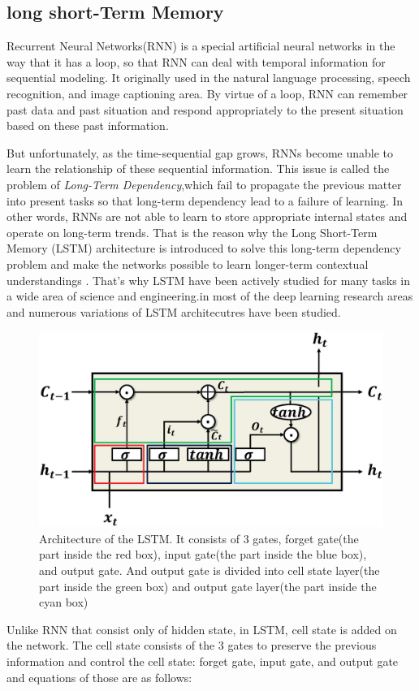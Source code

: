 \documentclass[letterpaper, 10 pt, conference]{ieeeconf}  %
\begin{document}
\subsection{long short-Term Memory}


Recurrent Neural Networks(RNN) is a special artificial neural networks in the way that it has a loop, so that RNN can deal with temporal information for sequential modeling. It originally used in the natural language processing, speech recognition, and image captioning area. By virtue of a loop, RNN can remember past data and past situation and respond appropriately to the present situation based on these past information. 

But unfortunately, as the time-sequential gap grows, RNNs become unable to learn the relationship of these sequential information. This issue is called the problem of \textit{Long-Term Dependency},which fail to propagate the previous matter into present tasks so that long-term dependency lead to a failure of learning. In other words, RNNs are not able to learn to store appropriate internal states and operate on long-term trends. That is the reason why the Long Short-Term Memory (LSTM) architecture is introduced to solve this long-term dependency problem and make the networks possible to learn longer-term contextual
understandings \cite{hochreiter1997long}. That's why LSTM have been actively studied for many tasks in a wide area of science and engineering.in most of the deep learning research areas and numerous variations of LSTM architecutres have been studied.

\begin{figure}[h]
	\centering
	\includegraphics[width=.4\textwidth]{image/basic_LSTM_revised}
	\caption{Architecture of the LSTM. It consists of 3 gates, forget gate(the part inside the red box), input gate(the part inside the blue box), and output gate. And output gate is divided into cell state layer(the part inside the green box) and output gate layer(the part inside the cyan box) 
	}
	\label{fig:basic_lstm}
\end{figure}

Unlike RNN that consist only of hidden state, in LSTM, cell state is added on the network. The cell state consists of the 3 gates to preserve the previous information and control the cell state: forget gate, input gate, and output gate and equations of those are as follows:
\end{document}
